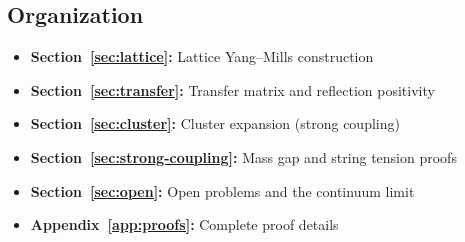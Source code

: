 \subsection{Organization}

\begin{itemize}
    \item \textbf{Section~\ref{sec:lattice}:} Lattice Yang--Mills construction
    \item \textbf{Section~\ref{sec:transfer}:} Transfer matrix and reflection positivity
    \item \textbf{Section~\ref{sec:cluster}:} Cluster expansion (strong coupling)
    \item \textbf{Section~\ref{sec:strong-coupling}:} Mass gap and string tension proofs
    \item \textbf{Section~\ref{sec:open}:} Open problems and the continuum limit
    \item \textbf{Appendix~\ref{app:proofs}:} Complete proof details
\end{itemize}


